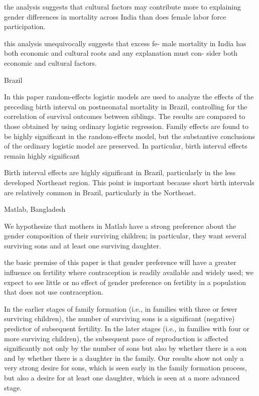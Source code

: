 the analysis suggests that cultural factors may contribute more to explaining gender
differences in mortality across India than does female labor force participation.

this analysis unequivocally suggests that excess fe-
male mortality in India has both economic and
cultural roots and any explanation must con-
sider both economic and cultural factors.

\citep{Curtis1993}

Brazil

In this paper random-effects logistic models are used to analyze the effects of the
preceding birth interval on postneonatal mortality in Brazil, controlling for the
correlation of survival outcomes between siblings. The results are compared to those
obtained by using ordinary logistic regression. Family effects are found to be highly
significant in the random-effects model, but the substantive conclusions of the
ordinary logistic model are preserved. In particular, birth interval effects remain
highly significant

Birth interval effects are highly significant in Brazil, particularly in the less developed
Northeast region. This point is important because short birth intervals are relatively common
in Brazil, particularly in the Northeast.


\citep{Rahman1993}

Matlab, Bangladesh

We hypothesize that mothers in Matlab have a strong preference about the gender composition of their surviving children; in particular, they want several surviving sons and at least one surviving daughter.

the basic premise of this paper is that gender preference will have a greater influence on fertility where contraception is readily available and widely used; we expect to see little or no effect of gender preference on fertility in a population that does not use contraception.

In the earlier stages of family formation (i.e., in families with three or fewer surviving children), the number of surviving sons is a significant (negative) predictor of subsequent fertility. In the later stages (i.e., in families with four or more surviving children), the subsequent pace of reproduction is affected significantly not only by the number of sons but also by whether there is a son and by whether there is a daughter in the family. Our results show not only a very strong desire for sons, which is seen early in the family formation process, but also a desire for at least one daughter, which is seen at a more advanced stage.

